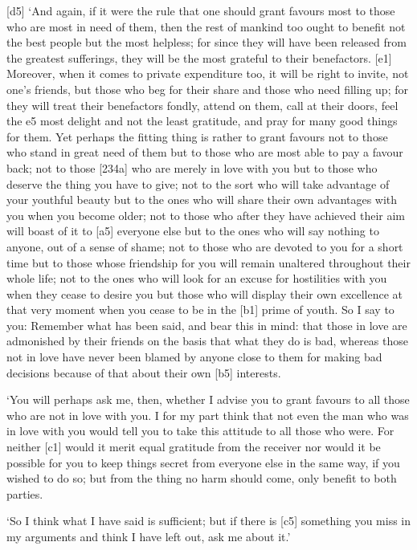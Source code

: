 {[}d5{]} ‘And again, if it were the rule that one should grant favours
most to those who are most in need of them, then the rest of mankind too
ought to benefit not the best people but the most helpless; for since
they will have been released from the greatest sufferings, they will be
the most grateful to their benefactors. {[}e1{]} Moreover, when it comes
to private expenditure too, it will be right to invite, not one's
friends, but those who beg for their share and those who need filling
up; for they will treat their benefactors fondly, attend on them, call
at their doors, feel the e5 most delight and not the least gratitude,
and pray for many good things for them. Yet perhaps the fitting thing is
rather to grant favours not to those who stand in great need of them but
to those who are most able to pay a favour back; not to those {[}234a{]}
who are merely in love with you but to those who deserve the thing you
have to give; not to the sort who will take advantage of your youthful
beauty but to the ones who will share their own advantages with you when
you become older; not to those who after they have achieved their aim
will boast of it to {[}a5{]} everyone else but to the ones who will say
nothing to anyone, out of a sense of shame; not to those who are devoted
to you for a short time but to those whose friendship for you will
remain unaltered throughout their whole life; not to the ones who will
look for an excuse for hostilities with you when they cease to desire
you but those who will display their own excellence at that very moment
when you cease to be in the {[}b1{]} prime of youth. So I say to you:
Remember what has been said, and bear this in mind: that those in love
are admonished by their friends on the basis that what they do is bad,
whereas those not in love have never been blamed by anyone close to them
for making bad decisions because of that about their own {[}b5{]}
interests.

‘You will perhaps ask me, then, whether I advise you to grant favours to
all those who are not in love with you. I for my part think that not
even the man who was in love with you would tell you to take this
attitude to all those who were. For neither {[}c1{]} would it merit
equal gratitude from the receiver nor would it be possible for you to
keep things secret from everyone else in the same way, if you wished to
do so; but from the thing
no harm should come, only benefit to both parties.

‘So I think what I have said is sufficient; but if there is {[}c5{]}
something you miss in my
arguments and think I have left out, ask me about it.'

